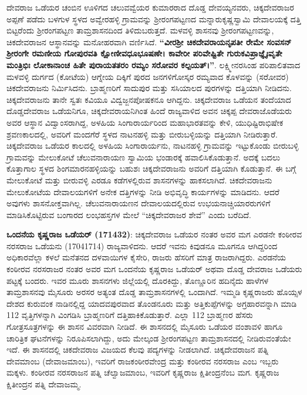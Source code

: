 ದೇವರಾಜ ಒಡೆಯರ ಚಂಬಿನ ಊಳಿಗದ ಚಲುವವ್ವೆಯರ ಕುಮಾರರಾದ ದೊಡ್ಡ ದೇವಯ್ಯನವರು, ಚಿಕ್ಕದೇವರಾಜರ ಅಪ್ಪಣೆ ಪಡೆದು ಬಳಗುಳ ಸ್ಥಳದ ಅವ್ವೇರಹಳ್ಳಿ ಗ್ರಾಮವನ್ನು ಶ‍್ರೀರಂಗಪಟ್ಟಣದ ಮನ್ನಾರುಕೃಷ್ಣಸ್ವಾಮಿ ದೇವಾಲಯಕ್ಕೆ ದತ್ತಿ ಬಿಟ್ಟರೆಂದು ಶ‍್ರೀರಂಗಪಟ್ಟಣ ತಾಮ್ರಶಾಸನದಿಂದ ತಿಳಿದುಬರುತ್ತದೆ. ಮಳವಳ್ಳಿ ಶಾಸನವು ಶ‍್ರೀರಂಗಪಟ್ಟಣವನ್ನು, ಚಿಕದೇವರಾಜನ ಆಸ್ಥಾನವನ್ನು ಮನೋಹರವಾಗಿ ವರ್ಣಿಸಿದೆ. \textbf{“ವೀರಶ‍್ರೀ ಚಿಕದೇವರಾಯನೃಪತೀ ರೇಮೇ ಸಂವಸನ್​ ಶ‍್ರೀರಂಗೇ ರಮಣೀಯ ಗೋಪುರವತಿ ಕ್ಷೋಣೀವಧೂಭೂಷಣೇ। ಕಾವೇರೀ ಪರಿವೇಷ್ಟಿತೇ ಗುರುಕವಿಪ್ರಾಜ್ಞೈಃವೃತೇ ಮಂತ್ರಿಭಿಃ ಲೋಕಾನಾಂಚ ಹಿತೇ ಪುರಾಯತತರಂ ರಮ್ಯಂ ಸರೋವರ ಕಲ್ಪಯತ್​।”}. ಲಕ್ಷ್ಮೀನರಸಿಂಹ ಪರಿಪಾಲಿತವಾದ ಮಳವಳ್ಳಿ ದುರ್ಗದ (ಕೋಟೆಯ) ಆಗ್ನೇಯ ದಿಕ್ಕಿಗೆ ಪುರದ ಜನಗಳಿಗೋಸ್ಕರ ರಮ್ಯವಾದ ಕೊಳವನ್ನು (ಸರೋವರ) ಚಿಕದೇವರಾಜನು ನಿರ್ಮಿಸಿದನು. ಬ್ರಾಹ್ಮಣರಿಗೆ ಸಾದುಪುರ ಮತ್ತು ಸಸಿಯಾಲದ ಪುರಗಳನ್ನು ದತ್ತಿಯಾಗಿ ನೀಡಿದನು. ಚಿಕ್ಕದೇವರಾಜನು ತಾನೇ ಸ್ವತಃ ಕವಿಯೂ ವಿದ್ವಜ್ಜನಪೋಷಕನೂ ಆಗಿದ್ದನು. ಚಿಕ್ಕದೇವರಾಜ ಒಡೆಯನ ತಂದೆಯಾದ ದೊಡ್ಡದೇವರಾಜ ಒಡೆಯನಿಗೂ, ಚಿಕ್ಕದೇವರಾಯನಿಗಿಂತ ಹಿಂದೆ ರಾಜ್ಯವಾಳಿದ ಅವನ ಚಿಕ್ಕಪ್ಪ ದೇವರಾಜೊಡೆಯರು ಅವರ ಆಸ್ಥಾನ ವಿದ್ವಾಂಸ\-ರಾಗಿದ್ದ, ಅಳಹಿಯ ಸಿಂಗಾರಾರ್ಯರಿಂದ ಮಹಾಭಾರತವನ್ನು ಕೇಳಿ, ಯುಧಿಷ್ಟಿರಾಭಿಷೇಕ ಶ್ರವಣಕಾಲದಲ್ಲಿ, ಅವರಿಗೆ ಮಂದಗೆರೆ ಸ್ಥಳದ ನಾಟನಹಳ್ಳಿ ಮತ್ತು ಬೀರುಬಳ್ಳಿಯನ್ನು ದತ್ತಿಯಾಗಿ ನೀಡಿರುತ್ತಾರೆ. ಚಿಕ್ಕದೇವರಾಜ ಒಡೆಯರ ಕಾಲದಲ್ಲಿ ಅಳಹಿಯ ಸಿಂಗಾರಾರ್ಯನು, ನಾಟನಹಳ್ಳಿ ಗ್ರಾಮವನ್ನು ಇಟ್ಟುಕೊಂಡು ಬೀರುಬಳ್ಳಿ ಗ್ರಾಮವನ್ನು ಮೇಲುಕೋಟೆ ಚೆಲುವನಾರಾಯಣ ಸ್ವಾಮಿಯ ಭಂಡಾರಕ್ಕೆ ಹವಾಲಿಸಿಕೊಡುತ್ತಾನೆ. ಅದಕ್ಕೆ ಬದಲು ಕೊತ್ತಾಗಾಲ ಸ್ಥಳದ ಶಿಂಗಮಾರನಹಳ್ಳಿಯನ್ನು ಬಹುಶಃ ಚಿಕ್ಕದೇವರಾಜನು ಅವರಿಗೆ ದತ್ತಿಯಾಗಿ ಕೊಡುತ್ತಾನೆ. ಈ ಬಗ್ಗೆ ಮೇಲುಕೋಟೆ ಮತ್ತು ಬೀರುವಳ್ಳಿ ಎರಡೂ ಕಡೆಗಳಲ್ಲಿರುವ ಶಾಸನಗಳನ್ನು ಹಾಕಸಲಾಗಿದೆ. ಚಿಕದೇವರಾಜನು ಮೇಲುಕೋಟೆಯ ದೇವಾಲಯಗಳಿಗೆ ಅನೇಕ ದತ್ತಿಗಳನ್ನು ನೀಡಿ ಅಭಿವೃದ್ಧಿ ಕಾರ್ಯಗಳನ್ನು ಮಾಡಿದನು. ಆದರೆ ಅವುಗಳು ಶಾಸನೋಕ್ತವಾಗಿಲ್ಲ. ಚೆಲುವನಾರಾಯಣನ ದೇವಾಲಯದಲ್ಲಿರುವ ಉಭಯನಾಚ್ಚಿಯಾರರುಗಳಿಗೆ ಮಾಡಿಸಿಕೊಟ್ಟಿರುವ ಬಂಗಾರದ ಲಂಭಹಸ್ತಗಳ ಮೇಲೆ “ಚಿಕ್ಕದೇವರಾಜರ ಶೇವೆ” ಎಂದು ಬರೆದಿದೆ.

\textbf{ಒಂದನೆಯ ಕೃಷ್ಣರಾಜ ಒಡೆಯರ್​ (171432)}: ಚಿಕ್ಕದೇವರಾಜ ಒಡೆಯರ ನಂತರ ಅವರ ಮಗ ಎರಡನೇ ಕಂಠೀರವ ನರಸರಾಜ ಒಡೆಯನು (17041714) ರಾಜ್ಯವಾಳಿದನು. ಆದರೆ ಇವನು ಕಿವುಡನೂ ಮೂಗನೂ ಆಗಿದ್ದರಿಂದ ಅಧಿಕಾರವೆಲ್ಲಾ ಕಳಲೆ ಮನೆತನದ ದಳವಾಯಿಗಳ ಕೈಸೇರಿ, ರಾಜರು ಹೆಸರಿಗೆ ಮಾತ್ರ ರಾಜರಾಗಿದ್ದರು. ಎರಡನೆಯ ಕಂಠೀರವ ನರಸರಾಜರ ನಂತರ ಅವರ ಮಗ ಒಂದನೆಯ ಕೃಷ್ಣರಾಜ ಒಡೆಯರ್​ ಅಥವಾ ದೊಡ್ಡ ದೇವರಾಜ ಒಡೆಯರು ಪಟ್ಟಕ್ಕೆ ಬಂದರು. ಇವರ ಮೂರು ಶಾಸನಗಳು ಜಿಲ್ಲೆಯಲ್ಲಿ ದೊರಕಿದ್ದು, ತೊಣ್ಣೂರಿನ ಹದಿನೈದು ಹಾಳೆಗಳ ತಾಮ್ರಶಾಸನವು ಮೈಸೂರು ಅರಸರ ಅತ್ಯಂತ ದೊಡ್ಡ ತಾಮ್ರಶಾಸನಗಳಲ್ಲಿ ಒಂದಾಗಿದೆ. ಇಮ್ಮಡಿ ಕೃಷ್ಣರಾಜರು ಹೊಯ್ಸಳ ದೇಶದ ಕುರುವಂಕ ನಾಡಿನಲ್ಲಿದ್ದ ಯಾದವಪುರವಾದ ತೊಂಡನೂರು ಮತ್ತು ಅತ್ತಿಕುಪ್ಪೆಗಳನ್ನು ಅಗ್ರಹಾರವನ್ನಾಗಿ ಮಾಡಿ 112 ವೃತ್ತಿಗಳನ್ನಾಗಿ ವಿಂಗಡಿಸಿ ಬ್ರಾಹ್ಮಣರಿಗೆ ದತ್ತಿಹಾಕಿಕೊಡುತ್ತಾರೆ. ಎಲ್ಲಾ 112 ಬ್ರಾಹ್ಮಣರ ಹೆಸರು ಗೋತ್ರಸೂತ್ರಗಳನ್ನು ಈ ಶಾಸನ ವಿವರವಾಗಿ ನೀಡಿದೆ. ಈ ಶಾಸನದಲ್ಲಿ ಮೈಸೂರು ಒಡೆಯರ ವಂಶಾವಳಿ ಹಾಗೂ ಚಾರಿತ್ರಿಕ ಘಟನೆಗಳನ್ನು ನಿರೂಪಿಸಲಾಗಿದ್ದು, ಅದು ಮೇಲ್ಕಂಡ ಶ‍್ರೀರಂಗಪಟ್ಟಣ ತಾಮ್ರಶಾಸನದಲ್ಲಿ ನೀಡಿರುವಂತೆಯೇ ಇದೆ. ಈ ಶಾಸನದಲ್ಲಿ ಚಿಕದೇವರಾಜ ವಿಜಯದ ಕೆಲವು ಪದ್ಯಗಳನ್ನು ನೀಡಲಾಗಿದೆ. ಚಿಕ್ಕದೇವರಾಜನ ಪತ್ನಿ ದೇವಮಾಂಬ (ದೇವಾಜಮಾಂಬ), ಇವರಿಗೆ ರಾಜಕಂಠೀರವೇಂದ್ರ ಮತ್ತು ಕಂಠೀರವ ನರಸರಾಜ ಎಂಬ ಇಬ್ಬರು ಮಕ್ಕಳು. ಕಂಠೀರವ ನರಸರಾಜನ ಪತ್ನಿ ಚೆಲ್ವಾಜಮಾಂಬ, ಇವರಿಗೆ ಕೃಷ್ಣರಾಜ ಕ್ಷಿತೀಂದ್ರನೆಂಬ ಮಗ. ಕೃಷ್ಣರಾಜ ಕ್ಷಿತೀಂದ್ರನ ಪತ್ನಿ ದೇವಾಜಮ್ಮ. 

